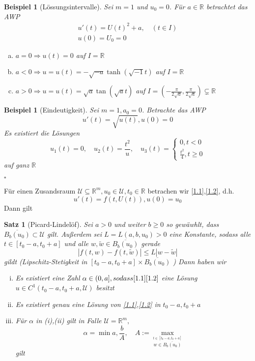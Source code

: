 \documentclass[11pt]{book}
\newcommand{\RR}{\mathbb{R}}
\newcommand{\UU}{\mathcal{U}}
\newcommand{\myQEDEnd}{\hfill\ensuremath{\square}}
\theoremstyle{break}
\theoremstyle{myStyle}
\newcounter{myCounter}[chapter]
\newtheorem{Bsp}[myCounter]{Beispiel}
\newtheorem{Satz}[myCounter]{Satz}
\begin{document}
\begin{Bsp}[L\"ossungsintervalle]
  Sei \( m = 1 \) und \( u_0 = 0 \). F\"ur \( a \in \RR \) betrachtet das AWP 
  \begin{align*}
    u'(t) = U(t)^2 + a, \quad (t\in I) \\
    u(0) = U_0 = 0
  \end{align*}
  \begin{enumerate}[(a)]
    \item \( a = 0 \Rightarrow u(t) = 0 \) auf \( I = \RR \) \\
    \item \( a < 0 \Rightarrow u = u(t) = - \sqrt{-a} \tanh(\sqrt{-1} t) \) auf
      \( I = \RR \) \\
    \item \( a > 0 \Rightarrow u = u(t) = \sqrt{a} \tan(\sqrt{a} t) \) auf \( I
      = (-\frac{\pi}{2\sqrt{a}},\frac{\pi}{2\sqrt{a}}) \subsetneq \RR \)
  \end{enumerate}
\end{Bsp}

\begin{Bsp}[Eindeutigkeit]
  Sei \( m= 1, a_0 = 0 \). Betrachte das AWP \[ u'(t) = \sqrt{u(t)}, u(0)=0 \]
  Es existiert die L\"osungen \[ u_1(t) = 0, \quad u_2(t) = \frac{t^2}{u},
    \quad u_3(t) = \left\{\begin{aligned} 0, t< 0 \\ \frac{t^2}{4}, t \geq 0
    \end{aligned} \right. \]
    auf ganz \( \RR \)

    \myQEDEnd
\end{Bsp}

F\"ur einen Zusandsraum \( \UU \subseteq \RR^m, u_0 \in \UU, t_0 \in \RR \)
betrachen wir \eqref{1.1},\eqref{1.2}, d.h. \[ u'(t) = f(t,U(t)), u(0) = u_0 \]
Dann gilt
\begin{Satz}[Picard-Lindel\"of]
  Sei \( a > 0 \) und weiter \( b \geq 0 \) so gew\"awhlt, dass \(
  \overline{B_b(u_0)} \subset \UU \) gilt. Au\ss erdem sei \( L = L(a,b,u_0) > 0 \)
  eine Konstante, sodass alle \(t \in [t_0-a,t_0+a] \) und alle \( w,\tilde{w}
  \in \overline{B_b(u_0)} \) gerade \[ |f(t,w) - f(t,\tilde{w})| \leq L |w -
    \tilde{w}
  | \] gildt (Lipschitz-Stetigkeit in \( [t_0-a,t_0+a] \times \overline{B_b(u_0)} \)
  )
  Dann haben wir
  \begin{enumerate}[(i)]
  \item Es existiert eine Zahl \( \alpha \in (0,a], sodass \eqref{1.1}
    \eqref{1.2} \) eine L\"osung \( u \in C^1(t_0-a,t_0+a,\UU) \) besitzt \\
  \item Es existiert genau eine L\"osung von \eqref{1.1},\eqref{1.2} in \(
    t_0-a,t_0+a \) \\
  \item F\"ur \( \alpha \) in (i),(ii) gilt in Falle \( \UU = \RR^m, \) \[
      \alpha = \min{a, \frac{b}{A}}, \quad A := \max_{\stackrel{t\in
         [t_0-a,t_0+a]}{w \in \overline{B_b(u_0)}}} \] gilt
  \end{enumerate}
\end{Satz}
\end{document}

